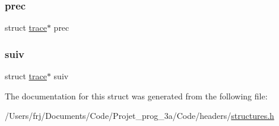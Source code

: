 \subsubsection{\texorpdfstring{prec}{prec}}
{\footnotesize\ttfamily struct \hyperlink{structtrace}{trace}$\ast$ prec}

\hypertarget{structtrace_ab7909a2cccd6f40ca9499c850c9c948c}{}\label{structtrace_ab7909a2cccd6f40ca9499c850c9c948c} 
\subsubsection{\texorpdfstring{suiv}{suiv}}
{\footnotesize\ttfamily struct \hyperlink{structtrace}{trace}$\ast$ suiv}



The documentation for this struct was generated from the following file\+:\begin{DoxyCompactItemize}
\item 
/\+Users/frj/\+Documents/\+Code/\+Projet\+\_\+prog\+\_\+3a/\+Code/headers/\hyperlink{structures_8h}{structures.\+h}\end{DoxyCompactItemize}
